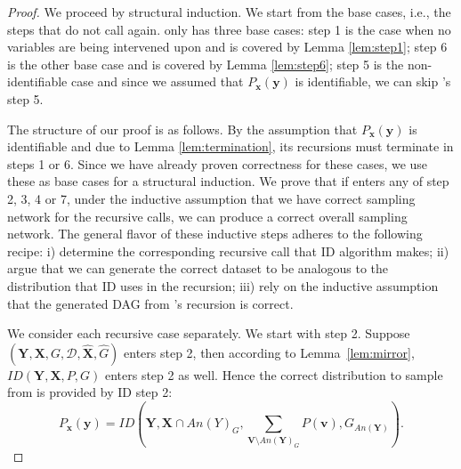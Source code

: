 \documentclass{article}
\newcommand{\h}{\mathcal{H}}
\newcommand{\x}{\mathbf{x}}
\newcommand{\y}{\mathbf{y}}
\newcommand{\X}{\mathbf{X}}
\newcommand{\Xp}{{\hat{\mathbf{X}}}}
\newcommand{\Gp}{{\hat{{G}}}}
\newcommand{\Y}{\mathbf{Y}}
\newcommand{\V}{\mathbf{V}}
\newcommand{\vb}{\mathbf{v}}
\newcommand{\data}{\mathcal{D}}
\newcommand{\idgen}{\text{ID-GEN}\xspace}
\newcommand{\idgenpar}{\idgen$(\mathbf{Y}, \mathbf{X},  G,  \data, {\Xp}, \Gp)$\xspace}
\theoremstyle{plain}
\theoremstyle{definition}
\theoremstyle{remark}
\begin{document}

	
	\begin{proof}
		We proceed by structural induction. We start from the base cases, i.e., the steps that do not call \idgen again. \idgen only has three base cases: step 1 is the case when no variables are being intervened upon and is covered by Lemma \ref{lem:step1}; step 6 is the other base case and is covered by Lemma \ref{lem:step6}; step 5 is the non-identifiable case and since we assumed that $P_{\x}(\y)$ is identifiable, 
  we can skip \idgen's step 5.
  
  The structure of our proof is as follows. By %
		the assumption that $P_{\x}(\y)$ is identifiable and due to Lemma \ref{lem:termination}, its recursions must terminate in steps 1 or 6. Since we have already proven correctness for these cases, we use these as base cases for a structural induction. We prove that if \idgen enters any of step 2, 3, 4 or 7, under the inductive assumption that we have correct sampling network for the recursive calls, we can produce a correct overall sampling network. The general flavor of these inductive steps adheres to the following recipe: i) determine the corresponding recursive call that ID algorithm makes; ii) argue that we can generate the correct dataset to be analogous to the distribution that ID uses in the recursion; iii) rely on the inductive assumption that the generated DAG from \idgen's recursion is correct.
		
		
		
		We consider each recursive case separately. We start with step 2. Suppose \idgenpar enters step 2, then 
		according to Lemma~\ref{lem:mirror}, $ID(\Y,\X, P, G)$ enters step 2 as well.
		Hence the correct distribution to sample from is provided by ID step 2: 
		\[P_{\x}(\y)= ID(\Y,\X\cap An(Y)_G, \sum_{\V\setminus An(\Y)_G} P(\vb), G_{An(\Y)}).\]




\end{proof}
\end{document}
